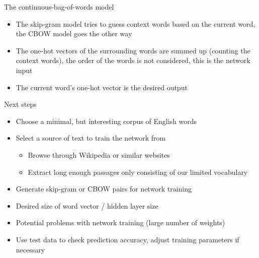 \documentclass{beamer}
\begin{document}
\begin{frame}{The continuous-bag-of-words model}
\begin{itemize}
    \item The skip-gram model tries to guess context words based on the current word, the CBOW model goes the other way
    \item The one-hot vectors of the surrounding words are summed up (counting the context words), the order of the words is not considered, this is the network input
    \item The current word's one-hot vector is the desired output
\end{itemize}

\end{frame}













\begin{frame}{Next steps}
\begin{itemize}
\item Choose a minimal, but interesting corpus of English words

\item Select a source of text to train the network from
    \begin{itemize}
        \item Browse through Wikipedia or similar websites
        \item Extract long enough passages only consisting of our limited vocabulary
    \end{itemize}

\item Generate skip-gram or CBOW pairs for network training

\item Desired size of word vector / hidden layer size

\item Potential problems with network training (large number of weights)

\item Use test data to check prediction accuracy, adjust training parameters if necessary
\end{itemize}
\end{frame}
\end{document}
